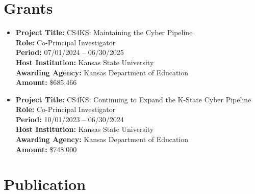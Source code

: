 \documentclass[11pt]{article}
\begin{document}
\vspace{0.8em} %

\section{Grants}
\begin{itemize}
    \item \textbf{Project Title:} CS4KS: Maintaining the Cyber Pipeline \\
    \textbf{Role:} Co-Principal Investigator \\
    \textbf{Period:} 07/01/2024 – 06/30/2025 \\
    \textbf{Host Institution:} Kansas State University \\
    \textbf{Awarding Agency:} Kansas Department of Education \\
    \textbf{Amount:} \$685,466 \\
    \item \textbf{Project Title:} CS4KS: Continuing to Expand the K-State Cyber Pipeline \\
    \textbf{Role:} Co-Principal Investigator \\
    \textbf{Period:} 10/01/2023 – 06/30/2024 \\
    \textbf{Host Institution:} Kansas State University \\
    \textbf{Awarding Agency:} Kansas Department of Education \\
    \textbf{Amount:} \$748,000 \\

\end{itemize}


\section*{Publication}
\end{document}

